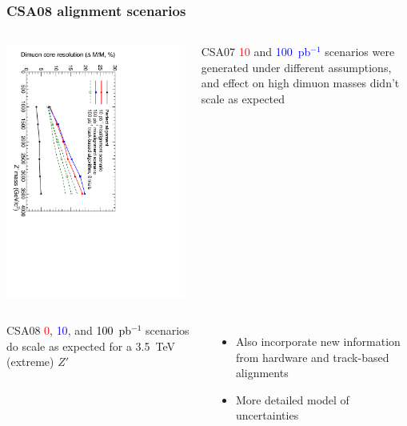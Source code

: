 \documentclass[compress]{beamer}
\begin{document}
\begin{frame}
\frametitle{CSA08 alignment scenarios}
\begin{columns}
\includegraphics[height=\linewidth, angle=90]{ZSSM_Align10-100_MassRes_color.pdf}
\begin{center}
CSA07 \textcolor{red}{10} and \textcolor{blue}{100~pb$^{-1}$} scenarios
were generated under different assumptions, and effect on high dimuon
masses didn't scale as expected
\end{center}
\end{columns}

\vspace{-0.5 cm}
\begin{columns}

\begin{center}
CSA08 \textcolor{red}{0}, \textcolor{blue}{10}, and
\textcolor{black}{100~pb$^{-1}$} scenarios do scale as expected for a
3.5~TeV (extreme) $Z'$
\end{center}

\vspace{-0.25 cm}
\scriptsize
\begin{itemize}
\item Also incorporate new information from hardware and track-based alignments
\item More detailed model of uncertainties
\end{itemize}


\end{columns}
\end{frame}
\end{document}
